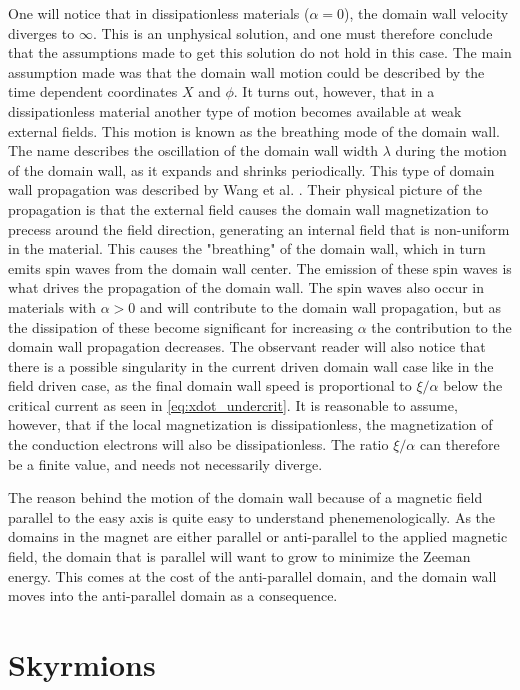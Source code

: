 \documentclass[12pt, a4paper, twoside, openright]{article}		%
\let\oldsection\section
\def\section{\cleardoublepage\oldsection}
\numberwithin{equation}{section}
\begin{document}
One will notice that in dissipationless materials ($\alpha = 0$), the domain wall velocity diverges to $\infty$. This is an unphysical solution, and one must therefore conclude that the assumptions made to get this solution do not hold in this case. The main assumption made was that the domain wall motion could be described by the time dependent coordinates $X$ and $\phi$. It turns out, however, that in a dissipationless material another type of motion becomes available at weak external fields. This motion is known as the breathing mode of the domain wall. The name describes the oscillation of the domain wall width $\lambda$ during the motion of the domain wall, as it expands and shrinks periodically. This type of domain wall propagation was described by Wang et al. \cite{Wang2012}. Their physical picture of the propagation is that the external field causes the domain wall magnetization to precess around the field direction, generating an internal field that is non-uniform in the material. This causes the "breathing" of the domain wall, which in turn emits spin waves from the domain wall center. The emission of these spin waves is what drives the propagation of the domain wall. The spin waves also occur in materials with $\alpha > 0$ and will contribute to the domain wall propagation, but as the dissipation of these become significant for increasing $\alpha$ the contribution to the domain wall propagation decreases. The observant reader will also notice that there is a possible singularity in the current driven domain wall case like in the field driven case, as the final domain wall speed is proportional to $\xi/\alpha$ below the critical current as seen in \eqref{eq:xdot_undercrit}. It is reasonable to assume, however, that if the local magnetization is dissipationless, the magnetization of the conduction electrons will also be dissipationless. The ratio $\xi/\alpha$ can therefore be a finite value, and needs not necessarily diverge.

The reason behind the motion of the domain wall because of a magnetic field parallel to the easy axis is quite easy to understand phenemenologically. As the domains in the magnet are either parallel or anti-parallel to the applied magnetic field, the domain that is parallel will want to grow to minimize the Zeeman energy. This comes at the cost of the anti-parallel domain, and the domain wall moves into the anti-parallel domain as a consequence.

\section{Skyrmions} \label{sec:Skyrmions}
\end{document}

